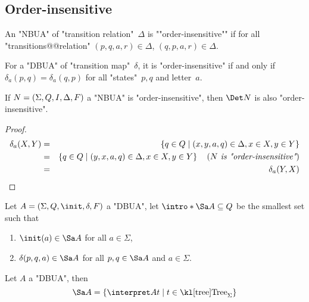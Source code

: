 \documentclass{article}
\begin{document}
\subsection{Order-insensitive}

\begin{definition}
	An "NBUA" of "transition relation"~$\Delta$ is ""order-insensitive"" if for all "transitions@@relation" $(p,q,a,r) \in \Delta$,
	$(q,p,a,r) \in \Delta$.
\end{definition}

\begin{remark}
	For a "DBUA" of "transition map"~$\delta$, it is "order-insensitive" if and only if
	$\delta_a (p,q) = \delta_a (q,p)$ for all "states"~$p,q$ and letter~$a$.
\end{remark}

\begin{lemma}
	If $N = (\Sigma, Q, I, \Delta, F)$ a "NBUA" is "order-insensitive", then $\Det N$ is also "order-insensitive".
\end{lemma}

\begin{proof}
	\begin{eqnarray*}
		\delta_a (X,Y) &=& \left\{q \in Q \mid (x,y,a,q) \in \Delta, x \in X, y \in Y\right\} \\
		&=& \left\{q \in Q \mid (y,x,a,q) \in \Delta, x \in X, y \in Y\right\}  \quad\left(\textit{$N$ is "order-insensitive"}\right) \\
		&=& \delta_a (Y,X)
	\end{eqnarray*}
\end{proof}

\begin{definition}
	Let $A = \DBUA$ a "DBUA", let $\intro* \Sa A \subseteq Q$ be the smallest set such that
	\begin{enumerate}
		\item $\init (a) \in \Sa A$ for all $a \in \Sigma$,
		\item $\delta (p,q,a) \in \Sa A$ for all $p,q \in \Sa A$ and $a \in \Sigma$.
	\end{enumerate}
\end{definition}


\begin{lemma}
	Let $A$ a "DBUA", then
	\[\Sa A = \setdef {\interpret A t} {t \in \tree_\Sigma} \]
\end{lemma}
\end{document}
